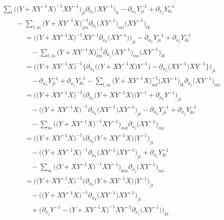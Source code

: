 \documentclass[pdftex]{sigma}
\numberwithin{equation}{section}
\begin{document}
\begin{gather*}
 \sum_l \bigl(\bigl(Y+XY^{-1}X\bigr)^{-1}XY^{-1}\bigr)_{jl}\partial_{x_k}\bigl(XY^{-1}\bigr)_{li}-\partial_{x_k}Y^{-1}_{ji}+\partial_{x_j}Y^{-1}_{ki}\\
 \qquad-\sum_{l,m}\bigl(Y+XY^{-1}X\bigr)^{-1}_{jm}\partial_{x_l}\bigl(XY^{-1}\bigr)_{mi} \bigl(XY^{-1}\bigr)_{lk} \\
\phantom{\qquad-}{}= \bigl(\bigl(Y+XY^{-1}X\bigr)^{-1}XY^{-1}\partial_{x_k}\bigl(XY^{-1}\bigr)\bigr)_{ji}-\partial_{x_k}Y^{-1}_{ji}+\partial_{x_j}Y^{-1}_{ki}\\
\phantom{\qquad-=}{} -\sum_{l,m}\bigl(Y+XY^{-1}X\bigr)^{-1}_{lm}\partial_{x_j}\bigl(XY^{-1}\bigr)_{mi} \bigl(XY^{-1}\bigr)_{lk} \\
\phantom{\qquad-}{}= \bigl(\bigl(Y+XY^{-1}X\bigr)^{-1}\big\{\partial_{x_k}\bigl(\bigl(Y+XY^{-1}X\bigr)Y^{-1}\bigr)-\partial_{x_k}\bigl(XY^{-1}\bigr)XY^{-1}\big\}\bigr)_{ji}\\
\phantom{\qquad-=}{} -\partial_{x_k}Y^{-1}_{ji}+\partial_{x_j}Y^{-1}_{ki}-\sum_{l,m}\bigl(Y+XY^{-1}X\bigr)^{-1}_{ml}\bigl(XY^{-1}\bigr)_{lk}\partial_{x_j}\bigl(XY^{-1}\bigr)_{mi} \\
\phantom{\qquad-}{}= \bigl(\bigl(Y+XY^{-1}X\bigr)^{-1}\bigl(\partial_{x_k}\bigl(Y+XY^{-1}X\bigr)\bigr)Y^{-1}+\partial_{x_k}Y^{-1}\bigr)_{ji}\\
 \phantom{\qquad-=}{} -\bigl(\bigl(Y+XY^{-1}X\bigr)^{-1}\partial_{x_k}\bigl(XY^{-1}\bigr)XY^{-1}\bigr)_{ji}-\partial_{x_k}Y^{-1}_{ji}+\partial_{x_j}Y^{-1}_{ki}\\
\phantom{\qquad-=}{} -\sum_m\bigl(\bigl(Y+XY^{-1}X\bigr)^{-1}XY^{-1}\bigr)_{mk}\partial_{x_j}\bigl(XY^{-1}\bigr)_{mi} \\
\phantom{\qquad-}{}= \bigl(\bigl(Y+XY^{-1}X\bigr)^{-1}\bigl(\partial_{x_k}\bigl(Y+XY^{-1}X\bigr)\bigr)Y^{-1}\bigr)_{ji}\\
\phantom{\qquad-=}{} -\bigl(\bigl(Y+XY^{-1}X\bigr)^{-1}\partial_{x_k}\bigl(XY^{-1}\bigr)XY^{-1}\bigr)_{ji}+\partial_{x_j}Y^{-1}_{ki}\\
\phantom{\qquad-=}{} -\sum_m\bigl(\bigl(Y+XY^{-1}X\bigr)^{-1}XY^{-1}\bigr)_{km}\partial_{x_j}\bigl(XY^{-1}\bigr)_{mi} \\
\phantom{\qquad-}{}= \bigl(\bigl(Y+XY^{-1}X\bigr)^{-1}\bigl(\partial_{x_k}\bigl(Y+XY^{-1}X\bigr)\bigr)Y^{-1}\bigr)_{ji}\\
\phantom{\qquad-=}{} -\bigl(\bigl(Y+XY^{-1}X\bigr)^{-1}\partial_{x_k}\bigl(XY^{-1}\bigr)XY^{-1}\bigr)_{ji}\\
\phantom{\qquad-=}{} +\bigl(\partial_{x_j}Y^{-1}-\bigl(Y+XY^{-1}X\bigr)^{-1}XY^{-1}\partial_{x_j}\bigl(XY^{-1}\bigr)\bigr)_{ki} \\

\end{gather*}
\end{document}
